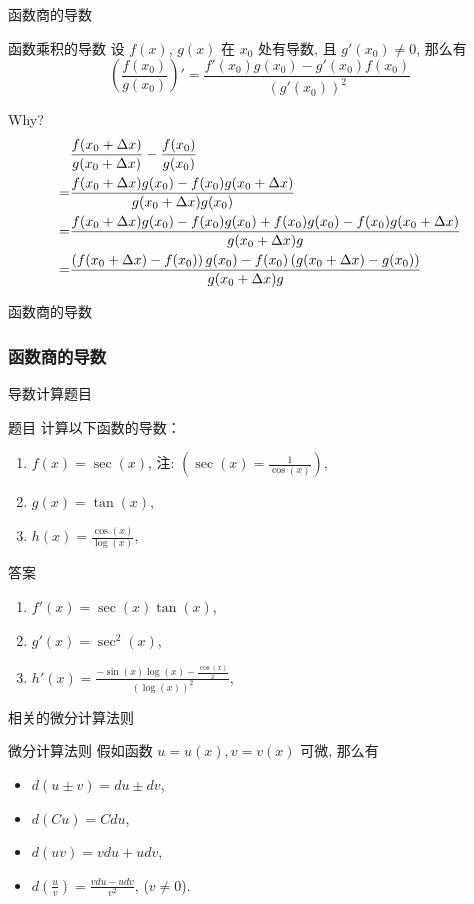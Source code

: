 \documentclass[
10pt,
aspectratio=43,
]{beamer}
\begin{document}
\begin{frame}{函数商的导数}
	\begin{block}{函数乘积的导数}
		设 $f(x)$, $g(x)$ 在 $x_0$ 处有导数, 且 $g'(x_0)\neq 0$, 那么有
		\[
			\left(\frac{f(x_0)}{g(x_0)}\right)' = \frac{f'(x_0)g(x_0)-g'(x_0)f(x_0)}{(g'(x_0))^2}
		\]
	\end{block}
	Why?
	\begin{align*}
		  & \frac{f(x_0+\Delta x)}{g(x_0+\Delta x)}-\frac{f(x_0)}{g(x_0)}                                                \\\bigskip
		= & \frac{f(x_0+\Delta x)g(x_0)-f(x_0)g(x_0+\Delta x)}{g(x_0+\Delta x)g(x_0)}                                    \\\bigskip
		= & \frac{f(x_0+\Delta x)g(x_0)-f(x_0)g(x_0)+f(x_0)g(x_0)-f(x_0)g(x_0+\Delta x)}{g(x_0+\Delta x)g}               \\\bigskip
		= & \frac{\left(f(x_0+\Delta x)-f(x_0)\right)g(x_0)-f(x_0)\left(g(x_0+\Delta x)-g(x_0)\right)}{g(x_0+\Delta x)g}
	\end{align*}
\end{frame}

\begin{frame}{函数商的导数}
	\frametitle{函数商的导数}{导数计算题目}
	\begin{exampleblock}{题目}
		计算以下函数的导数：
		\begin{enumerate}
			\item $f(x) = \sec(x)$, 注: $\left(\sec(x)=\displaystyle\frac{1}{\cos(x)}\right),$
			\item $g(x) = \tan(x)$,
			\item $h(x) = \displaystyle\frac{\cos(x)}{\log(x)}$,
		\end{enumerate}
	\end{exampleblock}

	\pause

	\begin{exampleblock}{答案}
		\begin{enumerate}
			\item $f'(x) = \sec(x) \tan(x)$,
			\item $g'(x) = \sec^2(x)$,
			\item $h'(x) = \displaystyle\frac{-\sin(x)\log(x)-\displaystyle\frac{\cos(x)}{x}}{(\log(x))^2}$,
		\end{enumerate}
	\end{exampleblock}
\end{frame}

\begin{frame}{相关的微分计算法则}
	\begin{alertblock}{微分计算法则}
		假如函数 $u=u(x), v=v(x)$ 可微, 那么有
		\begin{itemize}
			\item $d(u \pm v) = du \pm dv$,
			\item $d(Cu) = C du$,
			\item $d(uv) = v du + u dv$,
			\item $\displaystyle d\left(\frac{u}{v}\right) = \frac{v du - u dv}{v^2}$, ($v \neq 0$).
		\end{itemize}
	\end{alertblock}
\end{frame}
\end{document}
